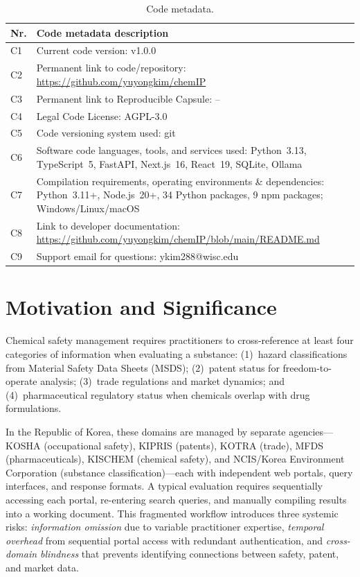 \documentclass[preprint,12pt]{elsarticle}
\begin{document}
\begin{table}[H]
\caption{Code metadata.}
\label{tab:code_metadata}
\small
\begin{tabular}{@{}lp{9cm}@{}}
\toprule
\textbf{Nr.} & \textbf{Code metadata description} \\
\midrule
C1 & Current code version: v1.0.0 \\
C2 & Permanent link to code/repository: \url{https://github.com/yuyongkim/chemIP} \\
C3 & Permanent link to Reproducible Capsule: -- \\
C4 & Legal Code License: AGPL-3.0 \\
C5 & Code versioning system used: git \\
C6 & Software code languages, tools, and services used: Python~3.13, TypeScript~5, FastAPI, Next.js~16, React~19, SQLite, Ollama \\
C7 & Compilation requirements, operating environments \& dependencies: Python~3.11+, Node.js~20+, 34 Python packages, 9 npm packages; Windows/Linux/macOS \\
C8 & Link to developer documentation: \url{https://github.com/yuyongkim/chemIP/blob/main/README.md} \\
C9 & Support email for questions: ykim288@wisc.edu \\
\bottomrule
\end{tabular}
\end{table}

\section{Motivation and Significance}
\label{sec:motivation}

Chemical safety management requires practitioners to cross-reference at least four categories of information when evaluating a substance: (1)~hazard classifications from Material Safety Data Sheets (MSDS); (2)~patent status for freedom-to-operate analysis; (3)~trade regulations and market dynamics; and (4)~pharmaceutical regulatory status when chemicals overlap with drug formulations.

In the Republic of Korea, these domains are managed by separate agencies---KOSHA (occupational safety), KIPRIS (patents), KOTRA (trade), MFDS (pharmaceuticals), KISCHEM (chemical safety), and NCIS/Korea Environment Corporation (substance classification)---each with independent web portals, query interfaces, and response formats.
A typical evaluation requires sequentially accessing each portal, re-entering search queries, and manually compiling results into a working document.
This fragmented workflow introduces three systemic risks: \emph{information omission} due to variable practitioner expertise, \emph{temporal overhead} from sequential portal access with redundant authentication, and \emph{cross-domain blindness} that prevents identifying connections between safety, patent, and market data.
\end{document}
